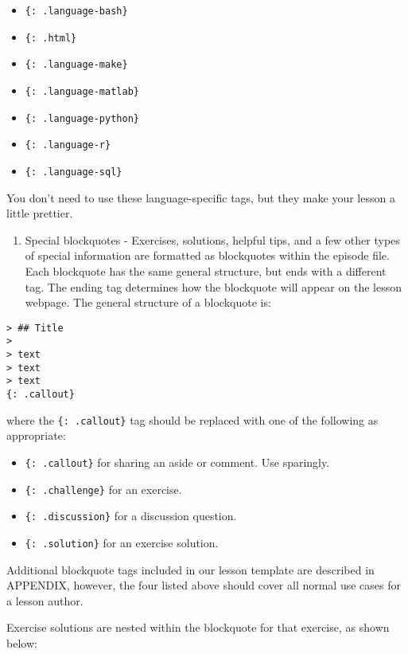 \documentclass[
]{book}
\providecommand{\tightlist}{%
  \setlength{\itemsep}{0pt}\setlength{\parskip}{0pt}}
\begin{document}
\begin{itemize}
\tightlist
\item
  \texttt{\{:\ .language-bash\}}
\item
  \texttt{\{:\ .html\}}
\item
  \texttt{\{:\ .language-make\}}
\item
  \texttt{\{:\ .language-matlab\}}
\item
  \texttt{\{:\ .language-python\}}
\item
  \texttt{\{:\ .language-r\}}
\item
  \texttt{\{:\ .language-sql\}}
\end{itemize}

You don't need to use these language-specific tags, but they make your lesson a little prettier.

\begin{enumerate}
\def\labelenumi{\arabic{enumi}.}
\tightlist
\item
  Special blockquotes - Exercises, solutions, helpful tips, and a few other types of special information are
  formatted as blockquotes within the episode file. Each blockquote has the same general structure, but ends
  with a different tag. The ending tag determines how the blockquote will appear on the lesson webpage. The
  general structure of a blockquote is:
\end{enumerate}

\begin{verbatim}
> ## Title
>
> text
> text
> text
{: .callout}
\end{verbatim}

where the \texttt{\{:\ .callout\}} tag should be replaced with one of the following as appropriate:

\begin{itemize}
\tightlist
\item
  \texttt{\{:\ .callout\}} for sharing an aside or comment. Use sparingly.
\item
  \texttt{\{:\ .challenge\}} for an exercise.
\item
  \texttt{\{:\ .discussion\}} for a discussion question.
\item
  \texttt{\{:\ .solution\}} for an exercise solution.
\end{itemize}

Additional blockquote tags included in our lesson template are described in APPENDIX, however, the four listed
above should cover all normal use cases for a lesson author.

Exercise solutions are nested within the blockquote for that exercise, as shown below:
\end{document}
